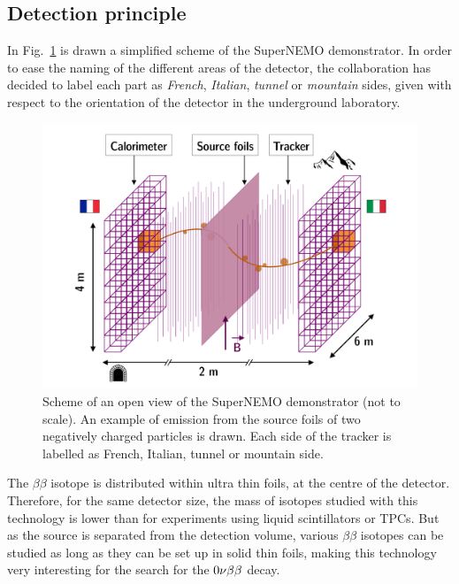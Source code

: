 \subsection{Detection principle}

In Fig.~\ref{fig:demonstrator_scheme} is drawn a simplified scheme of the SuperNEMO demonstrator.
In order to ease the naming of the different areas of the detector, the collaboration has decided to label each part as \emph{French}, \emph{Italian}, \emph{tunnel} or \emph{mountain} sides, given with respect to the orientation of the detector in the underground laboratory.
\begin{figure}[h!]
\centering
\includegraphics[width=1\textwidth]{SNdemonstrator/fig_SNdemonstrator/demonstrator_sheme.pdf}
\caption{Scheme of an open view of the SuperNEMO demonstrator (not to scale).
  An example of emission from the source foils of two negatively charged particles is drawn.
  Each side of the tracker is labelled as French, Italian, tunnel or mountain side.
\label{fig:demonstrator_scheme}}
\end{figure}

The $\beta\beta$ isotope is distributed within ultra thin foils, at the centre of the detector.
Therefore, for the same detector size, the mass of isotopes studied with this technology is lower than for experiments using liquid scintillators or TPCs.
But as the source is separated from the detection volume, various $\beta\beta$ isotopes can be studied as long as they can be set up in solid thin foils, making this technology very interesting for the search for the $0\nu\beta\beta$ decay.

